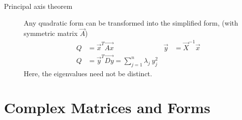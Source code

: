 \begin{description}
    \item[Principal axis theorem] Any quadratic form can be transformed into the
        simplified form, (with symmetric matrix $ \vec{A} $)
        \begin{align}
            Q       & = \vec{x}^T\vec{Ax}                                   &
            \vec{y} & = \vec{X}^{-1}\vec{x}                                   \\
            Q       & = \vec{y}^T\vec{Dy} = \sum_{j=1}^{n} \lambda_j\ y_j^2
        \end{align}
        Here, the eigenvalues need not be distinct.
\end{description}

\section{Complex Matrices and Forms}


